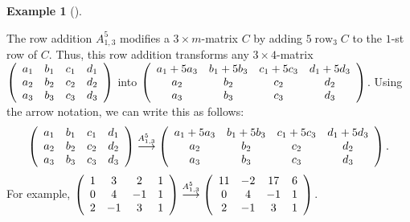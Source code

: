 \documentclass[numbers=enddot,12pt,final,onecolumn,notitlepage]{scrartcl}%
\theoremstyle{definition}
\newtheorem{exam}[theo]{Example}
\newenvironment{example}[1][]
{\begin{exam}[#1]\begin{leftbar}}
{\end{leftbar}\end{exam}}
\begin{document}
\begin{example}
The row addition $A_{1,3}^{5}$ modifies a $3\times m$-matrix $C$ by adding
$5\operatorname*{row}\nolimits_{3}C$ to the $1$-st row of $C$. Thus, this row
addition transforms any $3\times4$-matrix $\left(
\begin{array}
[c]{cccc}%
a_{1} & b_{1} & c_{1} & d_{1}\\
a_{2} & b_{2} & c_{2} & d_{2}\\
a_{3} & b_{3} & c_{3} & d_{3}%
\end{array}
\right)  $ into $\left(
\begin{array}
[c]{cccc}%
a_{1}+5a_{3} & b_{1}+5b_{3} & c_{1}+5c_{3} & d_{1}+5d_{3}\\
a_{2} & b_{2} & c_{2} & d_{2}\\
a_{3} & b_{3} & c_{3} & d_{3}%
\end{array}
\right)  $. Using the arrow notation, we can write this as follows:%
\[
\left(
\begin{array}
[c]{cccc}%
a_{1} & b_{1} & c_{1} & d_{1}\\
a_{2} & b_{2} & c_{2} & d_{2}\\
a_{3} & b_{3} & c_{3} & d_{3}%
\end{array}
\right)  \overset{A_{1,3}^{5}}{\longrightarrow}\left(
\begin{array}
[c]{cccc}%
a_{1}+5a_{3} & b_{1}+5b_{3} & c_{1}+5c_{3} & d_{1}+5d_{3}\\
a_{2} & b_{2} & c_{2} & d_{2}\\
a_{3} & b_{3} & c_{3} & d_{3}%
\end{array}
\right)  .
\]
For example, $\left(
\begin{array}
[c]{cccc}%
1 & 3 & 2 & 1\\
0 & 4 & -1 & 1\\
2 & -1 & 3 & 1
\end{array}
\right)  \overset{A_{1,3}^{5}}{\longrightarrow}\left(
\begin{array}
[c]{cccc}%
11 & -2 & 17 & 6\\
0 & 4 & -1 & 1\\
2 & -1 & 3 & 1
\end{array}
\right)  $.
\end{example}
\end{document}
